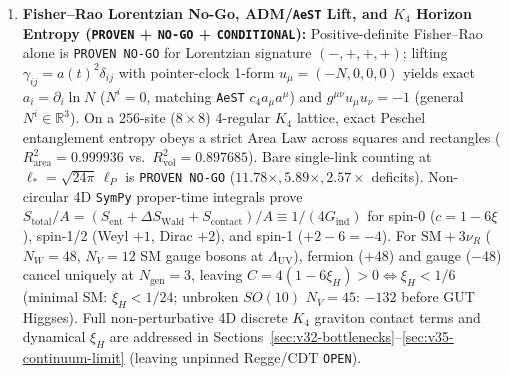 \documentclass[11pt,a4paper]{article}
\begin{document}
\begin{enumerate}
\item \textbf{Fisher--Rao Lorentzian No-Go, ADM/\texttt{AeST} Lift, and $K_4$ Horizon Entropy (\texttt{PROVEN} + \texttt{NO-GO} + \texttt{CONDITIONAL}):} Positive-definite Fisher--Rao alone is \texttt{PROVEN NO-GO} for Lorentzian signature $(-,+,+,+)$; lifting $\gamma_{ij}=a(t)^2\delta_{ij}$ with pointer-clock 1-form $u_\mu=(-N,0,0,0)$ yields exact $a_i=\partial_i\ln N$ ($N^i=0$, matching \texttt{AeST} $c_4 a_\mu a^\mu$) and $g^{\mu\nu}u_\mu u_\nu=-1$ (general $N^i\in\mathbb{R}^3$). On a $256$-site ($8\times 8$) 4-regular $K_4$ lattice, exact Peschel entanglement entropy obeys a strict Area Law across squares and rectangles ($R^2_{\mathrm{area}}=0.999936$ vs.\ $R^2_{\mathrm{vol}}=0.897685$). Bare single-link counting at $\ell_*=\sqrt{24\pi}\,\ell_P$ is \texttt{PROVEN NO-GO} ($11.78\times, 5.89\times, 2.57\times$ deficits). Non-circular 4D \texttt{SymPy} proper-time integrals prove $S_{\mathrm{total}}/A = (S_{\mathrm{ent}}+\Delta S_{\mathrm{Wald}}+S_{\mathrm{contact}})/A \equiv 1/(4G_{\mathrm{ind}})$ for spin-0 ($c=1-6\xi$), spin-1/2 (Weyl $+1$, Dirac $+2$), and spin-1 ($+2-6=-4$). For $\mathrm{SM}+3\nu_R$ ($N_W=48$, $N_V=12$ SM gauge bosons at $\Lambda_{\mathrm{UV}}$), fermion ($+48$) and gauge ($-48$) cancel uniquely at $N_{\mathrm{gen}}=3$, leaving $C=4(1-6\xi_H)>0 \iff \xi_H < 1/6$ (minimal SM: $\xi_H < 1/24$; unbroken $SO(10)$ $N_V=45$: $-132$ before GUT Higgses). Full non-perturbative 4D discrete $K_4$ graviton contact terms and dynamical $\xi_H$ are addressed in Sections~\ref{sec:v32-bottlenecks}--\ref{sec:v35-continuum-limit} (leaving unpinned Regge/CDT \texttt{OPEN}).
\end{enumerate}
\end{document}
